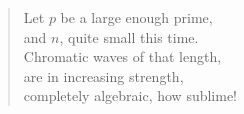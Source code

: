 
\thispagestyle{plain}

\vspace*{7cm}

\begin{verse}
    \hspace{8em}Let $p$ be a large enough prime, \\
    \vspace{5pt}
    \hspace{8em}and $n$, quite small this time. \\
    \vspace{5pt}
    \hspace{8em}Chromatic waves of that length, \\
    \vspace{5pt}
    \hspace{8em}are in increasing strength, \\
    \vspace{5pt}
    \hspace{8em}completely algebraic, how sublime! 

\end{verse}
